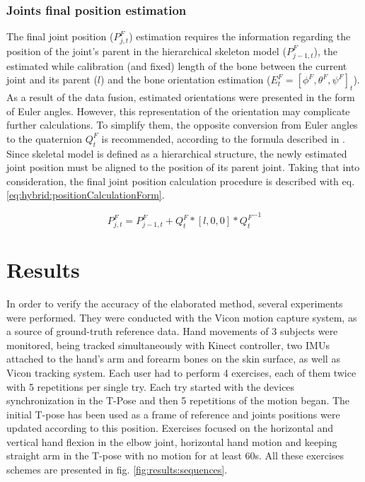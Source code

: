 \documentclass[sensors,article,submit,moreauthors,pdftex,10pt,a4paper]{mdpi}
\begin{document}
\subsubsection{Joints final position estimation}
The final joint position ($P_{j,t}^F$) estimation requires the information regarding the position of the joint’s parent in the hierarchical skeleton model ($P_{j-1,t}^F$), the estimated while calibration (and fixed) length of the bone between the current joint and its parent ($l$) and the bone orientation estimation ($E_t^F=[\phi^F,\theta^F,\psi^F]_t$). As a result of the data fusion, estimated orientations were presented in the form of Euler angles. However, this representation of the orientation may complicate further calculations. To simplify them, the opposite conversion from Euler angles to the quaternion $Q_t^F$ is recommended, according to the formula described in \cite{Dunn2011}. Since skeletal model is defined as a hierarchical structure, the newly estimated joint position must be aligned to the position of its parent joint. Taking that into consideration, the final joint position calculation procedure is described with eq. \ref{eq:hybrid:positionCalculationForm}.
		
\begin{equation} 	
	P_{j,t}^F=P_{j-1,t}^F+Q_t^F*[l,0,0]*{Q_t^F}^{-1}     
	\label{eq:hybrid:positionCalculationForm}              	
\end{equation}
		
\section{Results}
		
		
In order to verify the accuracy of the elaborated method, several experiments were performed. They were conducted with the Vicon motion capture system, as a source of ground-truth reference data. Hand movements of 3 subjects were monitored, being tracked simultaneously with Kinect controller, two IMUs attached to the hand's arm and forearm bones on the skin surface, as well as Vicon tracking system. Each user had to perform 4 exercises, each of them twice with 5 repetitions per single try. Each try started with the devices synchronization in the T-Pose and then 5 repetitions of the motion began. The initial T-pose has been used as a frame of reference and joints positions were updated according to this position. Exercises focused on the horizontal and vertical hand flexion in the elbow joint, horizontal hand motion and keeping straight arm in the T-pose with no motion for at least 60s. All these exercises schemes are presented in fig. \ref{fig:results:sequences}.
		
\end{document}
